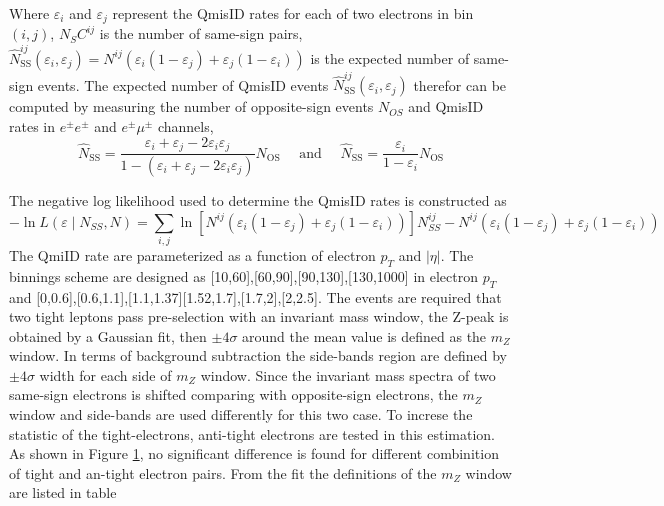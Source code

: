Where $\varepsilon_{i}$ and $\varepsilon_{j}$ represent the QmisID rates for each of two electrons in bin$(i,j)$, $N_SC^{i j}$ is the number of same-sign pairs,$\hat{N}_{\mathrm{SS}}^{i j}\left(\varepsilon_{i}, \varepsilon_{j}\right) = N^{ij}(\varepsilon_{i}(1-\varepsilon_{j})+\varepsilon_{j}(1-\varepsilon_{i}))$ is the expected number of same-sign events. The expected number of QmisID events $\hat{N}_{\mathrm{SS}}^{i j}\left(\varepsilon_{i}, \varepsilon_{j}\right)$ therefor can be computed by measuring the number of opposite-sign events $N_{OS}$ and QmisID rates in $e^{\pm}e^{\pm}$ and $e^{\pm}\mu^{\pm}$ channels,
\begin{equation}
\hat{N}_{\mathrm{SS}}=\frac{\varepsilon_{i}+\varepsilon_{j}-2 \varepsilon_{i} \varepsilon_{j}}{1-\left(\varepsilon_{i}+\varepsilon_{j}-2 \varepsilon_{i} \varepsilon_{j}\right)} N_{\mathrm{OS}} \quad \text { and } \quad \hat{N}_{\mathrm{SS}}=\frac{\varepsilon_{i}}{1-\varepsilon_{i}} N_{\mathrm{OS}}
\end{equation}

The negative log likelihood used to determine the QmisID rates is constructed as 
\begin{equation}
-\ln L\left(\varepsilon \mid N_{S S}, N\right)=\sum_{i, j} \ln \left[N^{i j}\left(\varepsilon_{i}(1-\varepsilon_{j})+\varepsilon_{j}(1- \varepsilon_{i})\right)\right] N_{S S}^{i j}-N^{i j}\left(\varepsilon_{i}(1-\varepsilon_{j})+\varepsilon_{j}(1- \varepsilon_{i})\right)
 \end{equation}
The QmiID rate are parameterized as a function of electron $p_T$ and $|\eta|$. The binnings scheme are designed as [10,60],[60,90],[90,130],[130,1000] in electron $p_T$ and [0,0.6],[0.6,1.1],[1.1,1.37][1.52,1.7],[1.7,2],[2,2.5]. The events are required that two tight leptons pass pre-selection with an invariant mass window, the Z-peak is obtained by a Gaussian fit, then $\pm4\sigma$ around the mean value is defined as the $m_Z$ window. In terms of background subtraction the side-bands region are defined by $\pm4\sigma$ width for each side of $m_Z$ window. Since the invariant mass spectra of two same-sign electrons is shifted comparing with opposite-sign electrons, the $m_Z$ window and side-bands are used differently for this two case. To increse the statistic of the tight-electrons, anti-tight electrons are tested in this estimation. As shown in Figure \ref{fig:qmisid_mll}, no significant difference is found for different combinition of tight and an-tight electron pairs. From the fit the definitions of the $m_Z$ window are listed in table
\begin{figure}[!htb]
\centering
{}
\quad 
{}
\caption{
}
\label{fig:qmisid_mll}
\end{figure}

